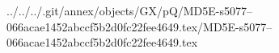 ../../../.git/annex/objects/GX/pQ/MD5E-s5077--066acae1452abccf5b2d0fc22fee4649.tex/MD5E-s5077--066acae1452abccf5b2d0fc22fee4649.tex